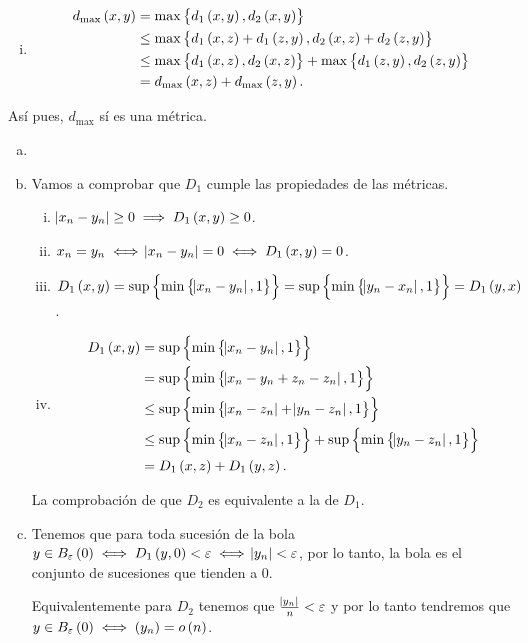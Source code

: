 \begin{eje}
\begin{enumerate}[i)]
        \item 
            \begin{align*}  
                d_{\max} \left( x, y \right) &= \max \left\{ d_1 \left( x, y \right), d_2 \left( x, y \right) \right\} \\
                &\leq \max \left\{ d_1 \left( x, z \right) + d_1 \left( z, y \right), d_2 \left( x, z \right) + d_2 \left( z, y \right) \right\} \\
                &\leq \max \left\{ d_1\left( x, z \right) , d_2 \left( x, z \right) \right\} + \max \left\{ d_1 \left( z, y \right) , d_2 \left( z, y \right) \right\} \\
                &=d_{\max} \left( x, z \right) + d_{\max} \left( z, y \right).
            \end{align*}
    \end{enumerate}
    Así pues, $d_{\max}$ sí es una métrica.
\end{eje}

\begin{eje}
  \begin{enumerate}[(a)]
   \item []
   \item Vamos a comprobar que $D_1$ cumple las propiedades de las métricas.
   \begin{enumerate}[i)]
   \item $\abs{x_n - y_n} \geq 0 \implies D_1\left( x,y\right) \geq 0$.
   \item $x_n = y_n \iff \abs{x_n-y_n}=0 \iff D_1\left( x,y\right)=0$.
   \item $D_1\left( x,y\right) = \sup \left\{ \min\left\{\abs{x_n-y_n},1\right\} \right\} = \sup\left\{ \min\left\{\abs{y_n-x_n},1\right\} \right\} = D_1\left( y,x\right)$.
   \item \begin{align*}
          D_1\left( x,y\right) & = \sup\left\{\min\left\{\abs{x_n-y_n},1\right\}\right\} \\
           & = \sup\left\{\min\left\{\abs{x_n-y_n+z_n-z_n},1\right\}\right\}\\
           & \leq \sup\left\{\min\left\{\abs{x_n -z_n}+\abs{y_n-z_n},1\right\}\right\} \\
           & \leq \sup\left\{\min\left\{\abs{x_n -z_n},1\right\}\right\} + \sup\left\{\min\left\{\abs{y_n-z_n},1\right\} \right\}\\
           & = D_1\left( x,z\right) + D_1\left( y,z\right).
         \end{align*}

   \end{enumerate}
   La comprobación de que $D_2$ es equivalente a la de $D_1$.
   \item Tenemos que para toda sucesión de la bola $y\in B_\varepsilon \left( 0\right) \iff D_1\left( y,0\right) <\varepsilon \iff \abs{y_n} < \varepsilon$, por lo tanto, la bola es el conjunto de sucesiones que tienden a $0$. 
   
   Equivalentemente para $D_2$ tenemos que $\frac{\abs{y_n}}{n} <\varepsilon$ y por lo tanto tendremos que $y\in B_\varepsilon \left( 0\right) \iff \left( y_n\right) = o\left( n\right)$.
  \end{enumerate}

 
\end{eje}
